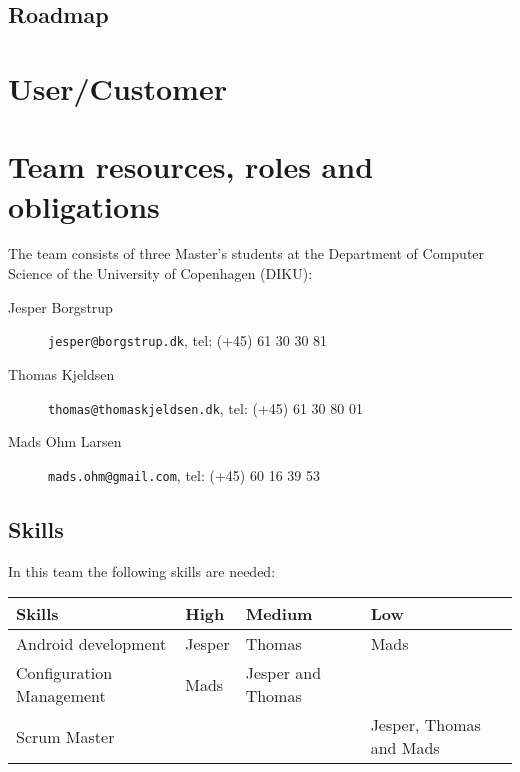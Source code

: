 \documentclass[a4paper,11pt]{article}
\begin{document}
\subsection{Roadmap} %
\label{subsec:roadmap}



\section{User/Customer} %
\label{sec:user_customer}


\section{Team resources, roles and obligations} %
\label{sec:team_resources_roles_and_obligations}
The team consists of three Master's students at the Department of Computer Science of the University of Copenhagen (DIKU): 

\begin{description}
\item[Jesper Borgstrup] {\tt jesper@borgstrup.dk}, tel: (+45) 61 30 30 81
\item[Thomas Kjeldsen] {\tt thomas@thomaskjeldsen.dk}, tel: (+45) 61 30 80 01
\item[Mads Ohm Larsen] {\tt mads.ohm@gmail.com}, tel: (+45) 60 16 39 53
\end{description}

\subsection{Skills} %
\label{subsec:skills}
In this team the following skills are needed:

\begin{tabular}{|p{4cm}|p{2cm}|p{3.5cm}|p{3.5cm}|}
\hline
\textbf{Skills}                   & \textbf{High}   & \textbf{Medium} & \textbf{Low} 					 \\\hline
Android development      & Jesper & Thomas & Mads 					 \\\hline
Configuration Management & Mads & Jesper and Thomas       &      					 \\\hline
Scrum Master             &        &        & Jesper, Thomas and Mads \\\hline 
\end{tabular}
\end{document}
